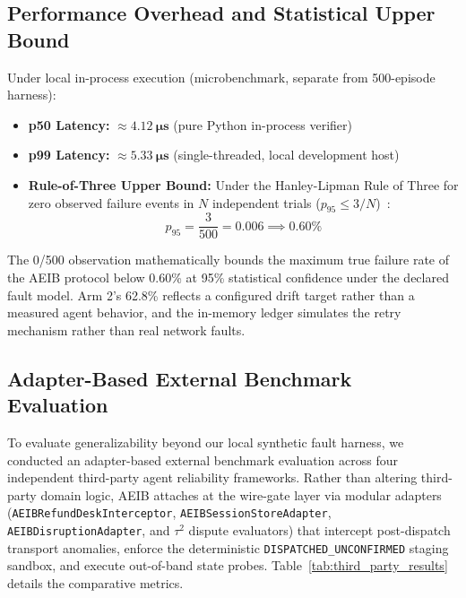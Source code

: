 \documentclass[10pt,journal,compsoc]{IEEEtran}
\begin{document}
\subsection{Performance Overhead and Statistical Upper Bound}
Under local in-process execution (microbenchmark, separate from 500-episode harness):
\begin{itemize}
    \item \textbf{p50 Latency:} $\approx \mathbf{4.12\ \mu s}$ (pure Python in-process verifier)
    \item \textbf{p99 Latency:} $\approx \mathbf{5.33\ \mu s}$ (single-threaded, local development host)
    \item \textbf{Rule-of-Three Upper Bound:} Under the Hanley-Lipman Rule of Three for zero observed failure events in $N$ independent trials ($p_{95} \le 3/N$)~\cite{hanley1983}:
    \begin{equation}
    p_{95} = \frac{3}{500} = 0.006 \implies \mathbf{0.60\%}
    \end{equation}
\end{itemize}
The 0/500 observation mathematically bounds the maximum true failure rate of the AEIB protocol below 0.60\% at 95\% statistical confidence under the declared fault model. Arm 2's 62.8\% reflects a configured drift target rather than a measured agent behavior, and the in-memory ledger simulates the retry mechanism rather than real network faults.

\subsection{Adapter-Based External Benchmark Evaluation}
To evaluate generalizability beyond our local synthetic fault harness, we conducted an adapter-based external benchmark evaluation across four independent third-party agent reliability frameworks. Rather than altering third-party domain logic, AEIB attaches at the wire-gate layer via modular adapters (\texttt{AEIBRefundDeskInterceptor}, \texttt{AEIBSessionStoreAdapter}, \texttt{AEIBDisruptionAdapter}, and $\tau^2$ dispute evaluators) that intercept post-dispatch transport anomalies, enforce the deterministic \texttt{DISPATCHED\_UNCONFIRMED} staging sandbox, and execute out-of-band state probes. Table~\ref{tab:third_party_results} details the comparative metrics.
\end{document}
